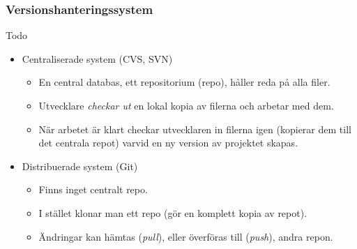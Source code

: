 \begin{frame}
    \frametitle{Versionshanteringssystem}

    
    \begin{block}{Todo}
        \begin{itemize}
        \item Centraliserade system (CVS, SVN)
        \begin{itemize}
            \item En central databas, ett repositorium (repo), håller reda på alla filer.
            \item Utvecklare \textit{checkar ut} en lokal kopia av filerna och arbetar med dem.
            \item När arbetet är klart checkar utvecklaren in filerna igen (kopierar dem till det centrala repot) varvid en ny version av projektet skapas.
        \end{itemize}
        \item Distribuerade system (Git)
        \begin{itemize}
            \item Finns inget centralt repo.
            \item I stället klonar man ett repo (gör en komplett kopia av repot).
            \item Ändringar kan hämtas (\textit{pull}), eller överföras till (\textit{push}), andra repon.
        \end{itemize}
        \end{itemize}
    \end{block}
    
\end{frame}

